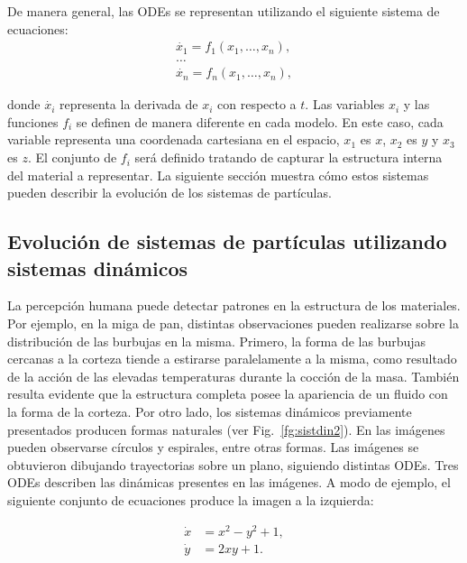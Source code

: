 De manera general, las ODEs se representan utilizando el siguiente sistema de ecuaciones:
\begin{equation} \label{eq:simple}  
  \begin{aligned}
    \dot{x_{1}} = f_{1}(x_{1},\ldots,x_{n}),\\
    \ldots\\
    \dot{x_{n}} = f_{n}(x_{1},\ldots,x_{n}),
  \end{aligned}
\end{equation}

\noindent donde $\dot{x_{i}}$ representa la derivada de $x_{i}$ con respecto
a $t$.
Las variables $x_{i}$ y las funciones $f_{i}$ se definen de manera diferente en cada modelo.
En este caso, cada variable representa una coordenada cartesiana en el espacio, $x_{1}$ es $x$, $x_{2}$ es $y$ y $x_{3}$ es $z$.
El conjunto de $f_{i}$ ser\'a definido tratando de capturar la estructura interna del material a representar. 
La siguiente secci\'on muestra cómo estos sistemas pueden describir la evoluci\'on de los sistemas de part\'iculas.

\subsection{Evoluci\'on de sistemas de part\'iculas utilizando sistemas din\'amicos}

La percepci\'on humana puede detectar patrones en la estructura de los materiales.
Por ejemplo, en la miga de pan, distintas observaciones pueden realizarse sobre la distribuci\'on de las burbujas en la misma.
Primero, la forma de las burbujas cercanas a la corteza tiende a estirarse paralelamente a la misma, como resultado de la acci\'on de las elevadas temperaturas durante la cocci\'on de la masa.
Tambi\'en resulta evidente que la estructura completa posee la apariencia de un fluido con la forma de la corteza.
Por otro lado, los sistemas din\'amicos previamente presentados producen formas naturales (ver Fig.~\ref{fg:sistdin2}).
En las im\'agenes pueden observarse c\'irculos y espirales, entre otras formas.
Las im\'agenes se obtuvieron dibujando trayectorias sobre un plano, siguiendo distintas ODEs.
Tres ODEs describen las din\'amicas presentes en las im\'agenes.
A modo de ejemplo, el siguiente conjunto de ecuaciones produce la imagen a la izquierda:

\begin{equation} \label{eq:simple}  
  \begin{aligned}
    \dot{x} &= x^{2}-y^{2}+1,\\
    \dot{y} &= 2xy+1.
  \end{aligned}
\end{equation}


